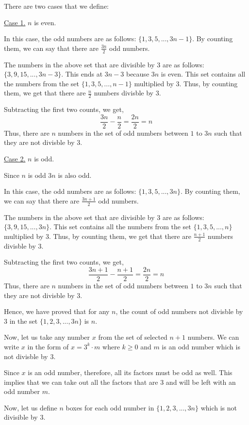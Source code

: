 \begin{solution}
There are two cases that we define:

\underline{Case 1.} $n$ is even.

In this case, the odd numbers are as follows: $\{1, 3, 5, ..., 3n-1\}$. 
By counting them, we can say that there are $\frac{3n}{2}$ odd numbers.

The numbers in the above set that are divisible by $3$ are as follows:
$\{3, 9, 15, ..., 3n-3\}$. This ends at $3n-3$ because $3n$ is even.
This set contains all the numbers from the set $\{1, 3, 5, ..., n-1\}$ multiplied by $3$.
Thus, by counting them, we get that there are $\frac{n}{2}$ numbers divisble by $3$.

Subtracting the first two counts, we get,
$$\frac{3n}{2} - \frac{n}{2} = \frac{2n}{2} = n$$
Thus, there are $n$ numbers in the set of odd numbers between $1$ to $3n$ such that they are not divisble by $3$.


\underline{Case 2.} $n$ is odd.

Since $n$ is odd $3n$ is also odd.

In this case, the odd numbers are as follows: $\{1, 3, 5, ..., 3n\}$. 
By counting them, we can say that there are $\frac{3n+1}{2}$ odd numbers.

The numbers in the above set that are divisible by $3$ are as follows:
$\{3, 9, 15, ..., 3n\}$.
This set contains all the numbers from the set $\{1, 3, 5, ..., n\}$ multiplied by $3$.
Thus, by counting them, we get that there are $\frac{n+1}{2}$ numbers divisble by $3$.

Subtracting the first two counts, we get,
$$\frac{3n+1}{2} - \frac{n+1}{2} = \frac{2n}{2} = n$$
Thus, there are $n$ numbers in the set of odd numbers between $1$ to $3n$ such that they are not divisble by $3$.


Hence, we have proved that for any $n$, the count of odd numbers not divisble by $3$ in the set $\{1, 2, 3, ..., 3n\}$ is $n$.

Now, let us take any number $x$ from the set of selected $n+1$ numbers. We can write $x$ in the form of $x = 3^k \cdot m$ where $k \geq 0$ and $m$ is an odd number which is not divisble by $3$.

Since $x$ is an odd number, therefore, all its factors must be odd as well. This implies that we can take out all the factors that are $3$ and will be left with an odd number $m$.

Now, let us define $n$ boxes for each odd number in $\{1, 2, 3, ..., 3n\}$ which is not divisible by $3$.


\end{solution}
